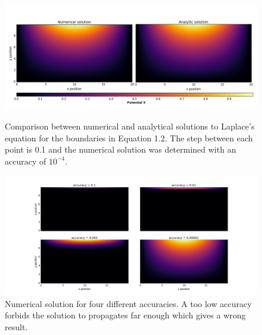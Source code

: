 \documentclass[10 pt]{article}
\numberwithin{equation}{section}
\begin{document}
\begin{figure}[H]
\includegraphics[width = \linewidth]{Laplace_equation}
\caption{Comparison between numerical and analytical solutions to Laplace's equation for the boundaries in Equation 1.2. The step between each point is 0.1 and the numerical solution was determined with an accuracy of $10^{-4}$.}

\includegraphics[width = \linewidth]{accuracy_relaxation}
\caption{Numerical solution for four different accuracies. A too low accuracy forbids the solution to propagates far enough which gives a wrong result.}
\end{figure}
\end{document}
